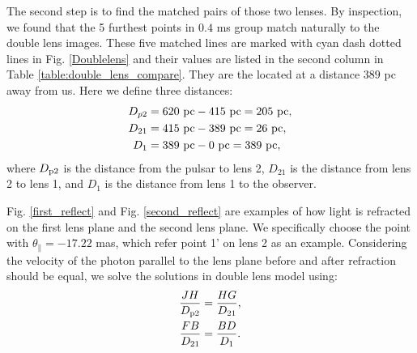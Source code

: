\documentclass[useAMS,usenatbib]{mn2e}
\begin{document}
The second step is to find the matched pairs of those two lenses. By inspection, we found that the 5 furthest points in $0.4$ ms group match naturally to the double lens images. These five matched lines are marked with cyan dash dotted lines in Fig. \ref{Doublelens} and their values are listed in the second column in Table \ref{table:double_lens_compare}. 
They are the located at a distance $389$ pc away from us. Here we define three distances:
\begin{equation}
\begin{aligned}
D_{p2}&=620~{\rm pc}-415~{\rm pc} =205~{\rm pc},\\
D_{21}&=415~{\rm pc}-389~{\rm pc} =26~{\rm pc},\\
D_{1}&=389~{\rm pc}- 0~{\rm pc} = 389~{\rm pc}, 
\end{aligned} 
\end{equation}
where $D_{\rm p2}$ is the distance from the pulsar to lens 2, $D_{21}$ is the distance from lens 2 to lens 1, and $D_{1}$ is the distance from lens 1 to the observer.

Fig. \ref{first_reflect} and Fig. \ref{second_reflect} are examples of how light is refracted on the first lens plane and the second lens plane. We specifically choose the point with $\theta_{\parallel}=-17.22$ mas, which refer point 1' on lens 2 as an example. Considering the velocity of the photon parallel to the lens plane before and after refraction should be equal, we solve the solutions in double lens model using:
\begin{equation}
\begin{aligned}
\frac{JH}{D_{\rm p2}}&=\frac{HG}{D_{21}},\\
\frac{FB}{D_{21}}&=\frac{BD}{D_{1}}.
\end{aligned}
\end{equation}
\end{document}

